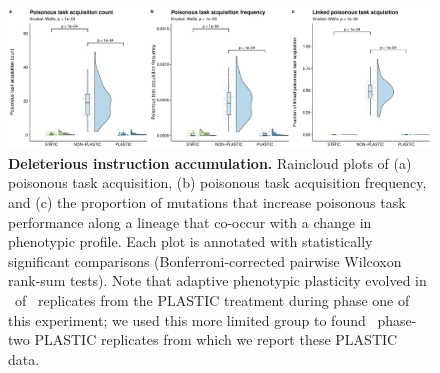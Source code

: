 \begin{figure}[ht!]
    \centering
    \includegraphics[width=1.0\textwidth]{chapters/03-evolutionary-consequences-of-plasticity/media/poison-accumulation-panel.pdf}
    \caption{\small
    \textbf{Deleterious instruction accumulation.}
    Raincloud plots of 
    (a) poisonous task acquisition,
    (b) poisonous task acquisition frequency,
    and (c) the proportion of mutations that increase poisonous task performance along a lineage that co-occur with a change in phenotypic profile.
    Each plot is annotated with statistically significant comparisons (Bonferroni-corrected pairwise Wilcoxon rank-sum tests).
    Note that adaptive phenotypic plasticity evolved in \deleteriousHitchhikingPlasticReps\ of \deleteriousHitchhikingReplicates\ replicates from the PLASTIC treatment during phase one of this experiment; 
    we used this more limited group to found \deleteriousHitchhikingPlasticReps\ phase-two PLASTIC replicates from which we report these PLASTIC data.
    }
    \label{chapter:consequences-of-plasticity:fig:deleterious-hitchhiking}
\end{figure}